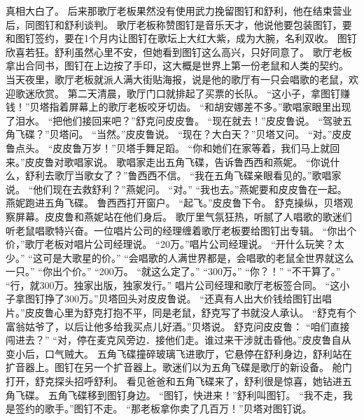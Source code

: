 \documentclass[a4paper,12pt,UTF8,twoside]{ctexbook}
\begin{document}
        真相大白了。 
        后来那歌厅老板果然没有使用武力挽留图钉和舒利，他在结束营业后，同图钉和舒利谈判。 
        歌厅老板称赞图钉是音乐天才，他说他要包装图钉，要和图钉签约，要在1个月内让图钉在歌坛上大红大紫，成为大腕，名利双收。 
        图钉欣喜若狂。舒利虽然心里不安，但她看到图钉这么高兴，只好同意了。 
        歌厅老板拿出合同书，图钉在上边按了手印，这大概是世界上第一份老鼠和人类的契约。 
        当天夜里，歌厅老板就派人满大街贴海报，说是他的歌厅有一只会唱歌的老鼠，欢迎歌迷欣赏。 
        第二天清晨，歌厅门口就排起了买票的长队。 
        “这小子，拿图钉赚钱！”贝塔指着屏幕上的歌厅老板咬牙切齿。 
        “和胡安娜差不多。”歌唱家眼里出现了泪水。 
        “把他们接回来吧？”舒克问皮皮鲁。 
        “现在就去！”皮皮鲁说。 
        “驾驶五角飞碟？”贝塔问。 
        “当然。”皮皮鲁说。 
        “现在？大白天？”贝塔又问。 
        “对。”皮皮鲁点头。 
        “皮皮鲁万岁！”贝塔手舞足蹈。 
        “你和她们在家等着，我们马上就回来。”皮皮鲁对歌唱家说。 
        歌唱家走出五角飞碟，告诉鲁西西和燕妮。 
        “你说什么，舒利去歌厅当歌女了？”鲁西西不信。 
        “我在五角飞碟亲眼看见的。”歌唱家说。 
        “他们现在去救舒利？”燕妮问。 
        “对。” 
        “我也去。”燕妮要和皮皮鲁在一起。 
        燕妮跑进五角飞碟。 
        鲁西西打开窗户。 
        “起飞。”皮皮鲁下令。 
        舒克操纵，贝塔观察屏幕。皮皮鲁和燕妮站在他们身后。 
        歌厅里气氛狂热，听腻了人唱歌的歌迷们听老鼠唱歌特兴奋。一位唱片公司的经理缠着歌厅老板要给图钉出专辑。 
        “你出个价，”歌厅老板对唱片公司经理说。 
        “20万。”唱片公司经理说。 
        “开什么玩笑？太少。” 
        “这可是大歌星的价。” 
        “会唱歌的人满世界都是，会唱歌的老鼠全世界就这么一只。” 
        “你出个价。” 
        “200万。 
        “就这么定了。” 
        “300万。” 
        “你？！” 
        “不干算了。” 
        “行，就300万。独家出版，独家发行。” 
        唱片公司经理和歌厅老板签合同。 
        “这小子拿图钉挣了300万。”贝塔回头对皮皮鲁说。 
        “还真有人出大价钱给图钉出唱片。”皮皮鲁心里为舒克打抱不平，同是老鼠，舒克写了书就没人承认。 
        “舒克有个富翁姑爷了，以后让他多给我买点儿好酒。”贝塔说。 
        舒克问皮皮鲁： 
       “咱们直接闯进去？” 
        “对，停在麦克风旁边．接他们走。谁过来干涉就击昏他。”皮皮鲁自从变小后，口气贼大。 
        五角飞碟撞碎玻璃飞进歌厅，它悬停在舒利身边，舒利站在扩音器上。图钉在另一个扩音器上。歌迷们以为五角飞碟是歌厅的新设备。 
        舱门打开，舒克探头招呼舒利。 
        看见爸爸和五角飞碟来了，舒利很是惊喜，她钻进五角飞碟。 
        五角飞碟移到图钉身边。 
        “图钉，快进来！”舒利叫图钉。 
        “我不走，我是签约的歌手。”图钉不走。 
        “那老板拿你卖了几百万！”贝塔对图钉说。 
\end{document}
